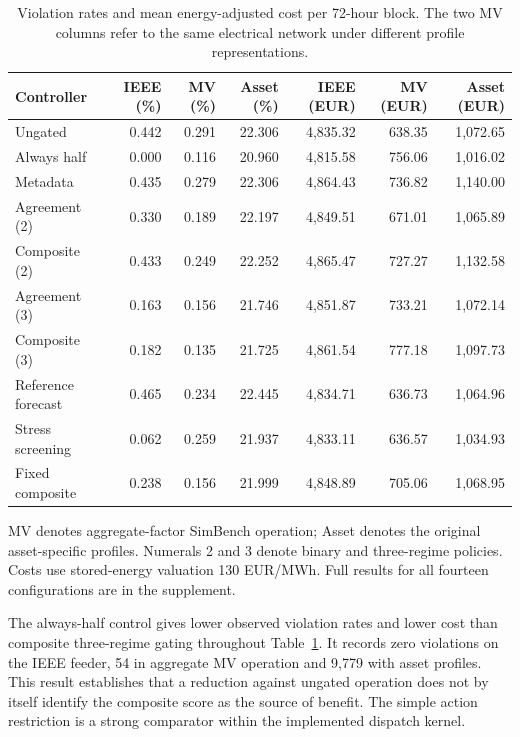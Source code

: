 \documentclass[preprint,12pt]{elsarticle}
\begin{document}
\begin{table}[tbp]
\centering\small\setlength{\tabcolsep}{3.5pt}
\caption{Violation rates and mean energy-adjusted cost per 72-hour block. The two MV columns refer to the same electrical network under different profile representations.}\label{tab:overall}
\begin{tabular}{lrrrrrr}
\toprule
Controller & IEEE (\%) & MV (\%) & Asset (\%) & IEEE (EUR) & MV (EUR) & Asset (EUR)\\\midrule
Ungated & 0.442 & 0.291 & 22.306 & 4,835.32 & 638.35 & 1,072.65\\
Always half & 0.000 & 0.116 & 20.960 & 4,815.58 & 756.06 & 1,016.02\\
Metadata & 0.435 & 0.279 & 22.306 & 4,864.43 & 736.82 & 1,140.00\\
Agreement (2) & 0.330 & 0.189 & 22.197 & 4,849.51 & 671.01 & 1,065.89\\
Composite (2) & 0.433 & 0.249 & 22.252 & 4,865.47 & 727.27 & 1,132.58\\
Agreement (3) & 0.163 & 0.156 & 21.746 & 4,851.87 & 733.21 & 1,072.14\\
Composite (3) & 0.182 & 0.135 & 21.725 & 4,861.54 & 777.18 & 1,097.73\\
Reference forecast & 0.465 & 0.234 & 22.445 & 4,834.71 & 636.73 & 1,064.96\\
Stress screening & 0.062 & 0.259 & 21.937 & 4,833.11 & 636.57 & 1,034.93\\
Fixed composite & 0.238 & 0.156 & 21.999 & 4,848.89 & 705.06 & 1,068.95\\
\bottomrule\end{tabular}
\par\smallskip\parbox{\linewidth}{\footnotesize MV denotes aggregate-factor SimBench operation; Asset denotes the original asset-specific profiles. Numerals 2 and 3 denote binary and three-regime policies. Costs use stored-energy valuation 130 EUR/MWh. Full results for all fourteen configurations are in the supplement.}
\end{table}
The always-half control gives lower observed violation rates and lower cost than composite three-regime gating throughout Table~\ref{tab:overall}. It records zero violations on the IEEE feeder, 54 in aggregate MV operation and 9,779 with asset profiles. This result establishes that a reduction against ungated operation does not by itself identify the composite score as the source of benefit. The simple action restriction is a strong comparator within the implemented dispatch kernel.
\end{document}
